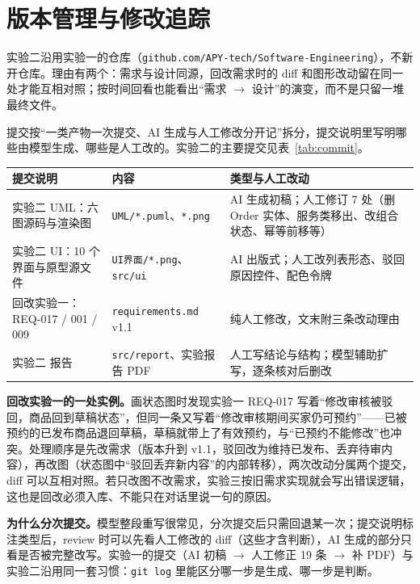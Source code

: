 \clearpage
\section{版本管理与修改追踪}\label{sec:git}

实验二沿用实验一的仓库（\texttt{github.com/APY-tech/Software-Engineering}），不新开仓库。理由有两个：需求与设计同源，回改需求时的 diff 和图形改动留在同一处才能互相对照；按时间回看也能看出“需求 \(\rightarrow\) 设计”的演变，而不是只留一堆最终文件。

提交按“一类产物一次提交、AI 生成与人工修改分开记”拆分，提交说明里写明哪些由模型生成、哪些是人工改的。实验二的主要提交见表~\ref{tab:commit}。

\begin{center}
\label{tab:commit}
\renewcommand{\arraystretch}{1.15}
\begin{tabularx}{\textwidth}{@{}p{4.65cm}Yp{5.1cm}@{}}
\toprule
提交说明 & 内容 & 类型与人工改动 \\
\midrule
实验二 UML：六图源码与渲染图 & \texttt{UML/*.puml}、\texttt{*.png} & AI 生成初稿；人工修订 7 处（删 Order 实体、服务类移出、改组合状态、幂等前移等） \\
实验二 UI：10 个界面与原型源文件 & \texttt{UI界面/*.png}、\texttt{src/ui} & AI 出版式；人工改列表形态、驳回原因控件、配色令牌 \\
回改实验一：REQ-017 / 001 / 009 & \texttt{requirements.md} v1.1 & 纯人工修改，文末附三条改动理由 \\
实验二 报告 & \texttt{src/report}、实验报告 PDF & 人工写结论与结构；模型辅助扩写，逐条核对后删改 \\
\bottomrule
\end{tabularx}
\end{center}

\textbf{回改实验一的一处实例。}画状态图时发现实验一 REQ-017 写着“修改审核被驳回，商品回到草稿状态”，但同一条又写着“修改审核期间买家仍可预约”——已被预约的已发布商品退回草稿，草稿就带上了有效预约，与“已预约不能修改”也冲突。处理顺序是先改需求（版本升到 v1.1，驳回改为维持已发布、丢弃待审内容），再改图（状态图中“驳回丢弃新内容”的内部转移），两次改动分属两个提交，diff 可以互相对照。若只改图不改需求，实验三按旧需求实现就会写出错误逻辑，这也是回改必须入库、不能只在对话里说一句的原因。

\textbf{为什么分次提交。}模型整段重写很常见，分次提交后只需回退某一次；提交说明标注类型后，review 时可以先看人工修改的 diff（这些才含判断），AI 生成的部分只看是否被完整改写。实验一的提交（AI 初稿 \(\rightarrow\) 人工修正 19 条 \(\rightarrow\) 补 PDF）与实验二沿用同一套习惯：\texttt{git log} 里能区分哪一步是生成、哪一步是判断。

